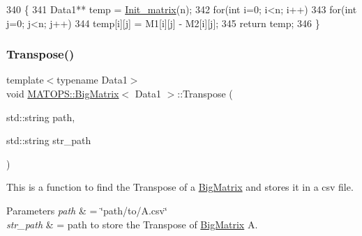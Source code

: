 \begin{DoxyCode}
340                         \{
341                                 Data1** temp = \hyperlink{classMATOPS_1_1BigMatrix_a2730be4ce100cfdbaf1240703bd9cfb9}{Init\_matrix}(n);
342                                 \textcolor{keywordflow}{for}(\textcolor{keywordtype}{int} i=0; i<n; i++)
343                                         \textcolor{keywordflow}{for}(\textcolor{keywordtype}{int} j=0; j<n; j++)
344                                                 temp[i][j] = M1[i][j] - M2[i][j];
345                                 \textcolor{keywordflow}{return} temp;
346                         \}
\end{DoxyCode}
\mbox{\label{classMATOPS_1_1BigMatrix_a3d3ca40bb701fbc884c6b603dd95e753}} 
\subsubsection{\texorpdfstring{Transpose()}{Transpose()}\hspace{0.1cm}{\footnotesize\ttfamily [1/2]}}
{\footnotesize\ttfamily template$<$typename Data1$>$ \\
void \hyperlink{classMATOPS_1_1BigMatrix}{M\+A\+T\+O\+P\+S\+::\+Big\+Matrix}$<$ Data1 $>$\+::Transpose (\begin{DoxyParamCaption}\item[{std\+::string}]{path,  }\item[{std\+::string}]{str\+\_\+path }\end{DoxyParamCaption})\hspace{0.3cm}{\ttfamily [inline]}}



This is a function to find the Transpose of a \hyperlink{classMATOPS_1_1BigMatrix}{Big\+Matrix} and stores it in a csv file. 


\begin{DoxyParams}{Parameters}
{\em path} & = \char`\"{}path/to/\+A.\+csv\char`\"{} \\
\hline
{\em str\+\_\+path} & = path to store the Transpose of \hyperlink{classMATOPS_1_1BigMatrix}{Big\+Matrix} A. \\
\hline
\end{DoxyParams}

